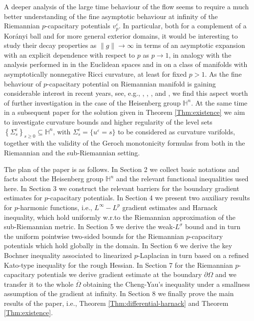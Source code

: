 \documentclass[10pt]{amsart}
\numberwithin{equation}{section}
\theoremstyle{definition}
\newcommand{\He}{\mathbb{H}}
\begin{document}
A deeper analysis of the large time behaviour of the flow seems to require a much better understanding of the fine asymptotic behaviour at infinity of the Riemannian $p$-capacitary potentials $v^\varepsilon_p$. In particular, both for a complement of a Kor\'anyi ball and for more general exterior domains, it would be interesting to study their decay properties as $\| g \| \to \infty$ in terms of an asymptotic expansion with an explicit dependence with respect to $p$ as $p \to 1$, in analogy with the analysis performed in \cite{KV} in the Euclidean spaces and in \cite{Benatti} on a class of manifolds with asymptotically nonnegative Ricci curvature, at least for fixed $p>1$. As the fine behaviour of $p$-capacitary potential on Riemannian manifold is gaining considerable interest in recent years, see, e.g., \cite{Mazzieri}, \cite{Mazzieri2}, \cite{Mazzieri3}, \cite{Mazzieri4} and \cite{Rigoli}, we find this aspect worth of further investigation in the case of the Heisenberg group $\He^n$. At the same time in a subsequent paper for the solution given in Theorem \ref{Thm:existence} we aim to investigate  curvature bounds and higher regularity of the level sets $\left\{ \Sigma^\varepsilon_s\right\}_{s\geq 0} \subseteq \He^n$, with $\Sigma^\varepsilon_s =\{u^\varepsilon=s \}$ to be considered as curvature varifolds, together with the validity of the Geroch monotonicity formulas from \cite{Moser3} both in the Riemannian and the sub-Riemannian setting.  

The plan of the paper is as follows. In Section 2 we collect basic notations and facts about the Heisenberg group $\He^n$ and the relevant functional inequalities used here. In Section 3 we construct the relevant barriers for the boundary gradient estimates for $p$-capacitary potentials. In Section 4 we present two auxiliary results for $p$-harmonic functions, i.e., $L^\infty-L^p$ gradient estimates and Harnack inequality, which hold uniformly w.r.to the Riemannian approximation of the sub-Riemannian metric. In Section 5 we derive the weak-$L^\sigma$ bound and in turn the uniform pointwise two-sided bounds for the Riemannian $p$-capacitary potentials which hold globally in the domain. 
In Section 6 we derive the key Bochner inequality associated to linearized $p$-Laplacian in turn based on a refined Kato-type inequality for the rough Hessian. In Section 7 
for the Riemannian $p$-capacitary potentials we derive gradient estimate at the boundary $\partial \Omega$ and we transfer it to the whole $\overline{\Omega}$ obtaining the Cheng-Yau's inequality under a smallness assumption of the gradient at infinity. In Section 8 we finally prove the main results of the paper, i.e., Theorem \ref{Thm:differential-harnack} and Theorem \ref{Thm:existence}. 
\medskip
\end{document}
